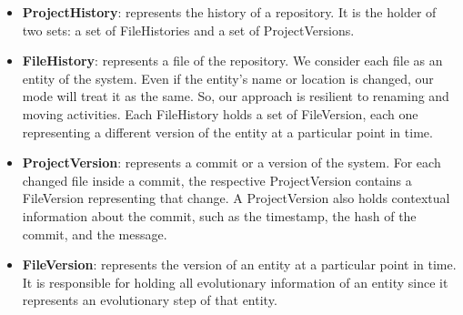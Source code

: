 \begin{itemize}
    \item \textbf{ProjectHistory}: represents the history of a repository. It is the holder of two sets: a set of FileHistories and a set of ProjectVersions. 
    \item \textbf{FileHistory}: represents a file of the repository. We consider each file as an entity of the system. Even if the entity's name or location is changed, our mode will treat it as the same. So, our approach is resilient to renaming and moving activities. Each FileHistory holds a set of FileVersion, each one representing a different version of the entity at a particular point in time.  
    \item \textbf{ProjectVersion}: represents a commit or a version of the system. 
    For each changed file inside a commit, the respective ProjectVersion contains a FileVersion representing that change.
    A ProjectVersion also holds contextual information about the commit, such as the timestamp, the hash of the commit, and the message.
    \item \textbf{FileVersion}: represents the version of an entity at a particular point in time.
    It is responsible for holding all evolutionary information of an entity since it represents an evolutionary step of that entity. 
\end{itemize}
\bigbreak

